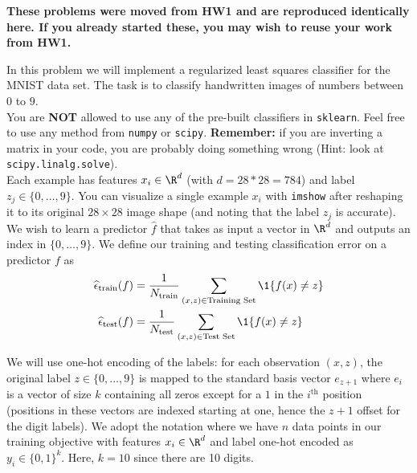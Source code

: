 \documentclass[shortlabels]{article}
\begin{document}
\textbf{These problems were moved from HW1 and are reproduced identically here. If you already started these, you may wish to reuse your work from HW1.}
\begin{aprob}
    In this problem we will implement a regularized least squares classifier for the MNIST data set. The task
    is to classify handwritten images of numbers between $0$ to $9$.\\

    You are \textbf{NOT} allowed to use any of the pre-built  classifiers in \verb|sklearn|.  Feel free to use any method from \verb|numpy| or \verb|scipy|. {\bf Remember:} if you are inverting a matrix in your code, you are probably doing something wrong (Hint: look at \verb|scipy.linalg.solve|).\\

    Each example has features $x_i \in \R^d$ (with $d=28*28=784$) and label $z_j \in \{0,\dots,9\}$. You can visualize a single example $x_i$ with \texttt{imshow} after reshaping it to its original $28 \times 28$ image shape (and noting that the label $z_j$ is accurate). We wish to learn a predictor $\widehat{f}$ that takes as input a vector in $\R^d$ and outputs an index in $\{0,\dots,9\}$. We define our training and testing classification error on a predictor $f$ as
    \begin{align*}
        \widehat{\epsilon}_{\textrm{train}}(f) &=
        \frac{1}{N _{\textrm{train}}} \sum_{(x,z)\in \textrm{Training Set}}     \1\{ f(x) \neq z \}
        \\
          \widehat{\epsilon}_{\textrm{test}}(f) &=
          \frac{1}{N _{\textrm{test}}} \sum_{(x,z)\in \textrm{Test Set}}     \1\{ f(x) \neq z \} 
    \end{align*}

    We will use one-hot encoding of the labels: for each observation $(x,z)$, the original label $z \in \{0, \ldots, 9\}$ is mapped to the standard basis vector $e_{z+1}$ where $e_i$ is a vector of size $k$ containing all zeros except for a $1$ in the $i^{\textrm{th}}$ position (positions in these vectors are indexed starting at one, hence the $z+1$ offset for the digit labels). We adopt the notation where we have $n$ data points in our training objective with features $x_i \in \R^d$ and label one-hot encoded as $y_i \in \{0,1\}^k$. Here, $k=10$ since there are 10 digits.


\end{aprob}
\end{document}
